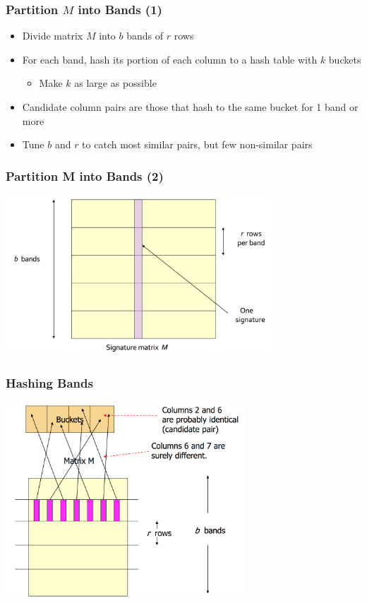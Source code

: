 \documentclass[svgnames]{beamer}
\begin{document}
  
\begin{frame} \frametitle{Partition $M$ into Bands (1)}

\begin{itemize}
\item Divide matrix $M$ into $b$ bands of $r$ rows
\item For each band, hash its portion of each column to a hash table with $k$ buckets
\begin{itemize}
\item Make $k$ as large as possible
\end{itemize}
\item Candidate column pairs are those that hash to the same bucket for 1 band or more
\item Tune $b$ and $r$ to catch most similar pairs, but few non-similar pairs
\end{itemize}
\end{frame}

  
\begin{frame} \frametitle{Partition M into Bands (2)}
\includegraphics[width=10cm]{bands}
\end{frame}

  
\begin{frame} \frametitle{Hashing Bands}
\includegraphics[width=9cm]{hashing-bands}
\end{frame}
\end{document}
